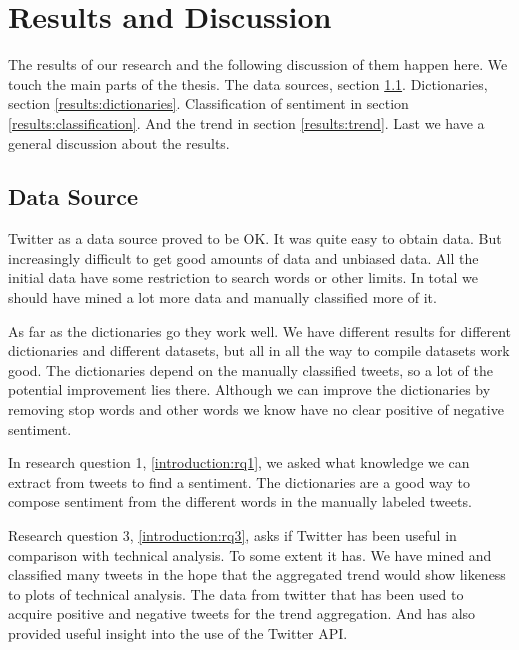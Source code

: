 \chapter{Results and Discussion}\label{results}

The results of our research and the following discussion of them happen here.
We touch the main parts of the thesis. The data sources, section
\ref{results:data_sources}. Dictionaries, section \ref{results:dictionaries}. Classification of sentiment in section
\ref{results:classification}. And the trend in section \ref{results:trend}.
Last we have a general discussion about the results. 
%

\section{Data Source}\label{results:data_sources}
Twitter as a data source proved to be OK. It was quite easy to obtain data. But
increasingly difficult to get good amounts of data and unbiased data. All the
initial data have some restriction to search words or other limits. In total we
should have mined a lot more data and manually classified more of it. 

As far as the dictionaries go they work well. We have different results for
different dictionaries and different datasets, but all in all the way to
compile datasets work good. The dictionaries depend on the manually classified
tweets, so a lot of the potential improvement lies there. Although we can
improve the dictionaries by removing stop words and other words we know have no
clear positive of negative sentiment. 

In research question 1, \ref{introduction:rq1}, we asked what knowledge we can
extract from tweets to find a sentiment. The dictionaries are a good way to
compose sentiment from the different words in the manually labeled tweets.

Research question 3, \ref{introduction:rq3}, asks if Twitter has been useful in
comparison with technical analysis. To some  extent it has. We have mined and
classified many tweets in the hope that the aggregated trend would show
likeness to plots of technical analysis. The data from twitter that has been
used to acquire positive and negative tweets for the trend aggregation. And has
also provided useful insight into the use of the Twitter API. 
%

